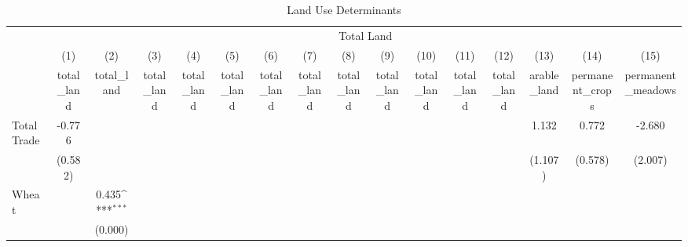 \begin{table}[htbp]\centering
\def\sym#1{\ifmmode^{#1}\else\(^{#1}\)\fi}
\caption{Land Use Determinants\label{tab:landuse}}
\begin{tabular}{l*{15}{c}}
\toprule
          &\multicolumn{15}{c}{Total Land}                                                                                                                                                                                                                                                             \\\cmidrule(lr){2-16}
          &\multicolumn{1}{c}{(1)}&\multicolumn{1}{c}{(2)}&\multicolumn{1}{c}{(3)}&\multicolumn{1}{c}{(4)}&\multicolumn{1}{c}{(5)}&\multicolumn{1}{c}{(6)}&\multicolumn{1}{c}{(7)}&\multicolumn{1}{c}{(8)}&\multicolumn{1}{c}{(9)}&\multicolumn{1}{c}{(10)}&\multicolumn{1}{c}{(11)}&\multicolumn{1}{c}{(12)}&\multicolumn{1}{c}{(13)}&\multicolumn{1}{c}{(14)}&\multicolumn{1}{c}{(15)}\\
          &\multicolumn{1}{c}{total\_land}&\multicolumn{1}{c}{total\_land}&\multicolumn{1}{c}{total\_land}&\multicolumn{1}{c}{total\_land}&\multicolumn{1}{c}{total\_land}&\multicolumn{1}{c}{total\_land}&\multicolumn{1}{c}{total\_land}&\multicolumn{1}{c}{total\_land}&\multicolumn{1}{c}{total\_land}&\multicolumn{1}{c}{total\_land}&\multicolumn{1}{c}{total\_land}&\multicolumn{1}{c}{total\_land}&\multicolumn{1}{c}{arable\_land}&\multicolumn{1}{c}{permanent\_crops}&\multicolumn{1}{c}{permanent\_meadows}\\
\midrule
Total Trade&   -0.776         &                  &                  &                  &                  &                  &                  &                  &                  &                  &                  &                  &    1.132         &    0.772         &   -2.680         \\
          &  (0.582)         &                  &                  &                  &                  &                  &                  &                  &                  &                  &                  &                  &  (1.107)         &  (0.578)         &  (2.007)         \\
Wheat     &                  &    0.435\sym{***}&                  &                  &                  &                  &                  &                  &                  &                  &                  &                  &                  &                  &                  \\
          &                  &  (0.000)         &                  &                  &                  &                  &                  &                  &                  &                  &                  &                  &                  &                  &                  \\

\end{tabular}
\end{table}
